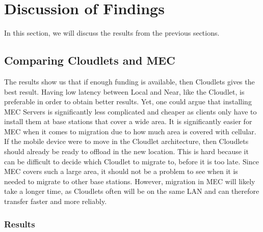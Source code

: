 



\section{Discussion of Findings}
In this section, we will discuss the results from the previous sections. 


\subsection{Comparing Cloudlets and MEC}
The results show us that if enough funding is available, then Cloudlets gives the best result. Having low latency between Local and Near, like the Cloudlet, is preferable in order to obtain better results. Yet, one could argue that installing MEC Servers is significantly less complicated and cheaper as clients only have to install them at base stations that cover a wide area. It is significantly easier for MEC when it comes to migration due to how much area is covered with cellular. If the mobile device were to move in the Cloudlet architecture, then Cloudlets should already be ready to offload in the new location. This is hard because it can be difficult to decide which Cloudlet to migrate to, before it is too late. Since MEC covers such a large area, it should not be a problem to see when it is needed to migrate to other base stations. However, migration in MEC will likely take a longer time, as Cloudlets often will be on the same LAN and can therefore transfer faster and more reliably.




\subsubsection{Results}

